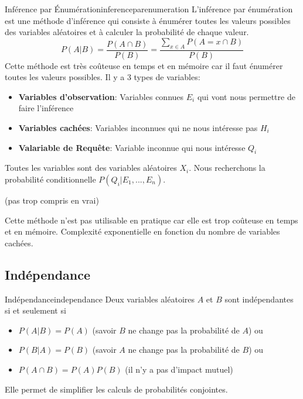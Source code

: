 \begin{definition}{Inférence par Énumération}{inferenceparenumeration}
    L'inférence par énumération est une méthode d'inférence qui consiste à énumérer toutes les valeurs possibles 
    des variables aléatoires et à calculer la probabilité de chaque valeur.
    \begin{equation}
        P(A|B) = \frac{P(A\cap B)}{P(B)} = \frac{\sum_{x \in A} P(A=x \cap B)}{P(B)}
    \end{equation} 
    Cette méthode est très coûteuse en temps et en mémoire car il faut énumérer toutes les valeurs possibles. 
    Il y a 3 types de variables:
    \begin{itemize}
        \item \textbf{Variables d'observation}: Variables connues $E_i$ qui vont nous permettre de faire l'inférence
        \item \textbf{Variables cachées}: Variables inconnues qui ne nous intéresse pas $H_i$ 
        \item \textbf{Valariable de Requête}: Variable inconnue qui nous intéresse $Q_i$
    \end{itemize}
    Toutes les variables sont des variables aléatoires $X_i$.
    Nous recherchons la probabilité conditionnelle $P(Q_i | E_1, ..., E_n)$.
\end{definition}

(pas trop compris en vrai)

\begin{remark}\leavevmode
    Cette méthode n'est pas utilisable en pratique car elle est trop coûteuse en temps et en mémoire. 
    Complexité exponentielle en fonction du nombre de variables cachées.
\end{remark}




\subsection{Indépendance} %
\label{sub:independance}


\begin{definition}{Indépendance}{independance}
    Deux variables aléatoires $A$ et $B$ sont indépendantes si et seulement si 
    \begin{itemize}[label=\textbullet]
        \item $P(A | B) = P(A)$  (savoir $B$ ne change pas la probabilité de $A$) ou
        \item $P(B | A) = P(B)$ (savoir $A$ ne change pas la probabilité de $B$) ou
        \item $P(A \cap B) = P(A)P(B)$ (il n'y a pas d'impact mutuel)
    \end{itemize}
    Elle permet de simplifier les calculs de probabilités conjointes.
\end{definition}

